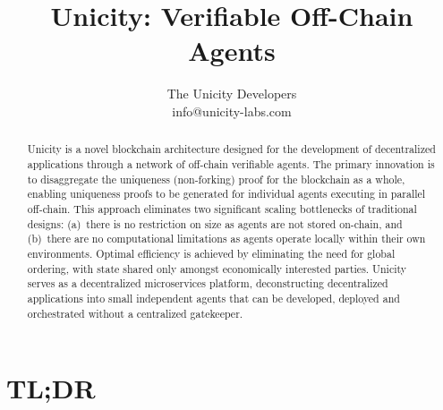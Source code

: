 \documentclass{article}
\title{Unicity: Verifiable Off-Chain Agents}
\author{The Unicity Developers\\info@unicity-labs.com}
\date{}
\begin{document}
\maketitle

\begin{abstract}

Unicity is a novel blockchain architecture designed for the development of decentralized applications through a network of off-chain verifiable agents. The primary innovation is to disaggregate the uniqueness (non-forking) proof for the blockchain as a whole, enabling uniqueness proofs to be generated for individual agents executing in parallel off-chain. This approach eliminates two significant scaling bottlenecks of traditional designs: (a)~there is no restriction on size as agents are not stored on-chain, and (b)~there are no computational limitations as agents operate locally within their own environments. Optimal efficiency is achieved by eliminating the need for global ordering, with state shared only amongst economically interested parties. Unicity serves as a decentralized microservices platform, deconstructing decentralized applications into small independent agents that can be developed, deployed and orchestrated without a centralized gatekeeper.

\end{abstract}

\section*{TL;DR}
\end{document}
